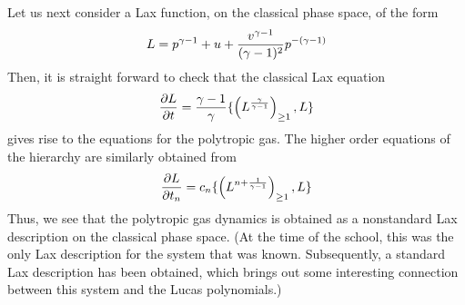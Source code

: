 \documentclass[a4paper,11pt]{article}
\begin{document}
Let us next consider a Lax function, on the classical phase space, of
the form 
\begin{equation}
L = p^{\gamma -1} + u + {v^{\gamma -1}\over (\gamma -1)^{2}}
p^{-(\gamma -1)}
\end{equation}
Then, it is straight forward to check that the classical Lax equation
\begin{equation}
{\partial L\over \partial t} = {\gamma -1\over \gamma}
\{\left(L^{\gamma\over \gamma -1}\right)_{\geq 1}, L\}
\end{equation}
gives rise to the equations for the polytropic gas. The higher order
equations of the hierarchy are similarly obtained from
\begin{equation}
{\partial L\over \partial t_{n}} = c_{n} \{\left(L^{n+{1\over \gamma
-1}}\right)_{\geq 1}, L\}
\end{equation}
Thus, we see that the polytropic gas dynamics is obtained as a
nonstandard Lax description on the classical phase space. (At the time
of the school, this was the only Lax description for the system that
was known. Subsequently, a standard Lax description has been obtained,
which brings out some interesting connection between this system and
the Lucas polynomials.)
\end{document}
